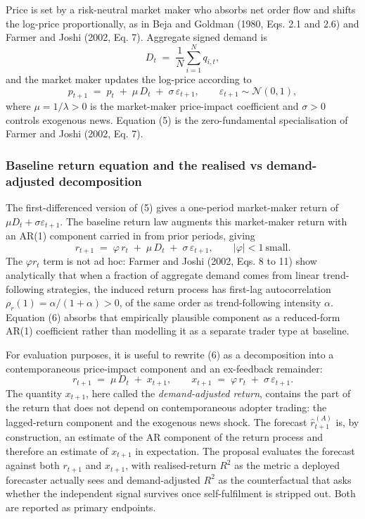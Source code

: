 \documentclass[11pt]{article}
\begin{document}
Price is set by a risk-neutral market maker who absorbs net order flow and shifts the log-price proportionally, as in Beja and Goldman (1980, Eqs. 2.1 and 2.6) and Farmer and Joshi (2002, Eq. 7). Aggregate signed demand is
\begin{equation}
  D_t \;=\; \frac{1}{N} \sum_{i=1}^{N} q_{i,t},
\end{equation}
and the market maker updates the log-price according to
\begin{equation}
  p_{t+1} \;=\; p_t \;+\; \mu\, D_t \;+\; \sigma\, \varepsilon_{t+1}, \qquad \varepsilon_{t+1} \sim \mathcal{N}(0, 1),
\end{equation}
where $\mu = 1/\lambda > 0$ is the market-maker price-impact coefficient and $\sigma > 0$ controls exogenous news. Equation (5) is the zero-fundamental specialisation of Farmer and Joshi (2002, Eq. 7).

\subsubsection{Baseline return equation and the realised vs demand-adjusted decomposition}

The first-differenced version of (5) gives a one-period market-maker return of $\mu D_t + \sigma \varepsilon_{t+1}$. The baseline return law augments this market-maker return with an AR(1) component carried in from prior periods, giving
\begin{equation}
  r_{t+1} \;=\; \varphi\, r_t \;+\; \mu\, D_t \;+\; \sigma\, \varepsilon_{t+1}, \qquad |\varphi| < 1\ \text{small.}
\end{equation}
The $\varphi r_t$ term is not ad hoc: Farmer and Joshi (2002, Eqs. 8 to 11) show analytically that when a fraction of aggregate demand comes from linear trend-following strategies, the induced return process has first-lag autocorrelation $\rho_r(1) = \alpha / (1 + \alpha) > 0$, of the same order as trend-following intensity $\alpha$. Equation (6) absorbs that empirically plausible component as a reduced-form AR(1) coefficient rather than modelling it as a separate trader type at baseline.

For evaluation purposes, it is useful to rewrite (6) as a decomposition into a contemporaneous price-impact component and an ex-feedback remainder:
\begin{equation}
  r_{t+1} \;=\; \mu\, D_t \;+\; x_{t+1}, \qquad x_{t+1} \;=\; \varphi\, r_t \;+\; \sigma\, \varepsilon_{t+1}.
\end{equation}
The quantity $x_{t+1}$, here called the \emph{demand-adjusted return}, contains the part of the return that does not depend on contemporaneous adopter trading: the lagged-return component and the exogenous news shock. The forecast $\hat{r}_{t+1}^{(A)}$ is, by construction, an estimate of the AR component of the return process and therefore an estimate of $x_{t+1}$ in expectation. The proposal evaluates the forecast against both $r_{t+1}$ and $x_{t+1}$, with realised-return $R^{2}$ as the metric a deployed forecaster actually sees and demand-adjusted $R^{2}$ as the counterfactual that asks whether the independent signal survives once self-fulfilment is stripped out. Both are reported as primary endpoints.
\end{document}
